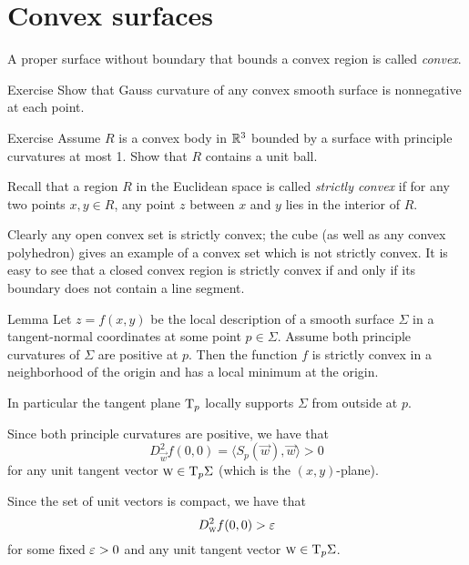 \section*{Convex surfaces}

A proper surface without boundary that bounds a convex region is called \emph{convex}.

\begin{thm}{Exercise}\label{ex:convex-surf}
Show that Gauss curvature of any convex smooth surface is nonnegative at each point.
\end{thm}

\begin{thm}{Exercise}\label{ex:convex-lagunov}
Assume $R$ is a convex body in $\mathbb{R}^3$ bounded by a surface with principle curvatures at most 1.
Show that $R$ contains a unit ball.
\end{thm}

Recall that a region $R$ in the Euclidean space is called  \emph{strictly convex} if for any two points $x,y\in R$, any point $z$ between $x$ and $y$ lies in the interior of $R$.

Clearly any open convex set is strictly convex;
the cube (as well as any convex polyhedron) gives an example of a convex set which is not strictly convex.
It is easy to see that a closed convex region is strictly convex if and only if its boundary does not contain a line segment. %

\begin{thm}{Lemma}\label{lem:gauss+=>convexity}
Let $z=f(x,y)$ be the local description of a smooth surface $\Sigma$ in a tangent-normal coordinates at some point $p\in\Sigma$.
Assume both principle curvatures of $\Sigma$ are positive at $p$.
Then the function $f$ is strictly convex in a neighborhood of the origin and has a local minimum at the origin. %

In particular the tangent plane $\mathrm{T}_p$ locally supports $\Sigma$ from outside at $p$.
\end{thm}

Since both principle curvatures are positive, we have that
\[D^2_{\vec w}f(0,0)=\langle S_p({\vec w}),{\vec w}\rangle>0\] 
for any unit tangent vector ${\textsc w}\in\mathrm{T}_p\Sigma$ (which is the $(x,y)$-plane).

Since the set of unit vectors is compact, we have that 
\[D^2_{\textsc w}f(0,0)>\varepsilon\]
for some fixed $\varepsilon>0$ and any unit tangent vector ${\textsc w}\in\mathrm{T}_p\Sigma$.

